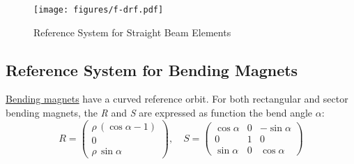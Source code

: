 
\begin{figure}[ht]
\centering
\setlength{\unitlength}{1pt}
\texttt{[image: figures/f-drf.pdf]}
\caption{Reference System for Straight Beam Elements}
\label{F-DRF}
\end{figure}
 

\subsection{Reference System for Bending Magnets}
\label{subsec:local-rbend}
\hyperref[sec:bend]{Bending magnets} have a curved reference orbit. 
For both rectangular and sector bending magnets, the \textit{R} and
\textit{S} are expressed as function the bend angle $\alpha$: 
\begin{equation}
R =
 \begin{pmatrix}
  \rho\,(\cos \alpha - 1) \\
  0 \\
  \rho\,\sin \alpha
 \end{pmatrix}
, \quad
S =
 \begin{pmatrix}
  \cos \alpha & 0 &  -\sin \alpha \\
  0 & 1 &  0 \\
  \sin \alpha & 0 &  \cos \alpha
 \end{pmatrix}
\end{equation}
 
